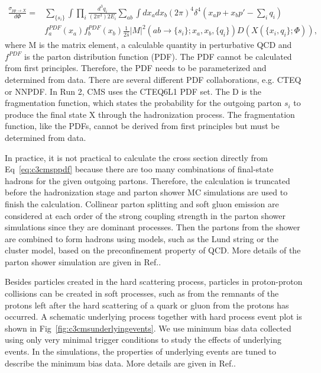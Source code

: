 \begin{equation}
  \begin{split}
		\frac{\sigma_{pp \rightarrow X}}{d\Phi}=& \sum_{\{s_{i}\}} \int \prod_{i} \frac{d^{3}q_{i}}{(2\pi^{3})2E_{i}} \sum_{ab} \int dx_{a}dx_{b}(2\pi)^{4}\delta^{4}(x_{a}p+x_{b}p\prime-\sum_{i}q_{i}) \\
	                                          & f_{a}^{PDF}(x_{a})f_{b}^{PDF}(x_{b}) \frac{1}{2\hat{s}}|M|^{2}(ab \rightarrow \{s_{i}\};x_{a},x_{b},\{q_{i}\}) D(X(\{x_{i},q_{i}\};\Phi)), 
  \end{split}
 \label{eq:c3cmsppdf}
\end{equation}
where M is the matrix element, a calculable quantity in perturbative QCD and $f^{PDF}$ is the parton distribution function (PDF)\cite{Butterworth:2015oua}. The PDF cannot be calculated from first principles. Therefore, the PDF needs to be parameterized and determined from data. There are several different PDF collaborations, e.g. CTEQ\cite{Lai:2010nw} or NNPDF\cite{Ball:2014uwa}. In Run 2, CMS uses the CTEQ6L1 PDF set. The D is the fragmentation function, which states the probability for the outgoing parton $s_{i}$ to produce the final state X through the hadronization process. The fragmentation function, like the PDFs, cannot be derived from first principles but must be determined from data.

In practice, it is not practical to calculate the cross section directly from Eq~\ref{eq:c3cmsppdf} because there are too many combinations of final-state hadrons for the given outgoing partons. Therefore, the calculation is truncated before the hadronization stage and parton shower MC simulations are used to finish the calculation. Collinear parton splitting and soft gluon emission are considered at each order of the strong coupling strength in the parton shower simulations since they are dominant processes. Then the
partons from the shower are combined to form hadrons using models, such as the Lund string\cite{Andersson:1983ia} or the cluster model, based on the preconfinement property of QCD\cite{Amati:1979fg}. More details of the parton shower simulation are given in Ref.\cite{Hoche:2014rga}.

Besides particles created in the hard scattering process, particles in proton-proton collisions can be created in soft processes, such as from the remnants of the protons left after the hard scattering of a quark or gluon from the protons has occurred. A schematic underlying process together with hard process event plot is shown in Fig~\ref{fig:c3cmsunderlyingevents}. We use minimum bias data collected using only very minimal trigger conditions to study the effects of underlying events. In the simulations, the properties of underlying events are tuned to describe the minimum bias data. More details are given in Ref.\cite{Field:1393621}. 

